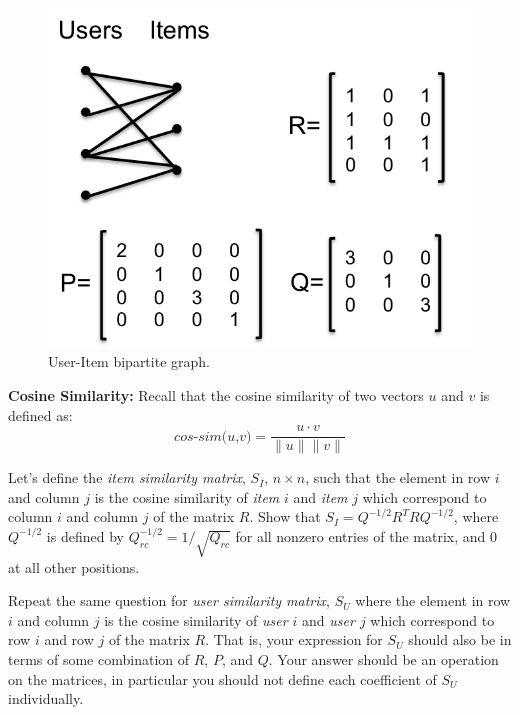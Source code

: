\begin{figure}[htbp]
\begin{center}
\includegraphics{user_item.png}
\caption{User-Item bipartite graph.}
\label{figpath}
\end{center}
\end{figure}

\vspace{0.4in}
\textbf{Cosine Similarity:} Recall that the cosine similarity of two vectors $u$
and $v$ is defined as:
\[ \textit{cos-sim(u,v)} = \frac {u \cdot v}{\|u\|\|v\|} \]


Let's define the \textit{item similarity matrix}, $S_{I}$, $n \times n$, such
that the element in row $i$ and column $j$ is the cosine similarity of \textit{item}
$i$ and \textit{item} $j$ which correspond to column $i$ and column $j$ of the matrix $R$. 
Show that $S_I = Q^{-1/2}R^TRQ^{-1/2}$, where $Q^{-1/2}$ is defined by $Q^{-1/2}_{rc} = 1/\sqrt{Q_{rc}}$ for all nonzero entries of the matrix, and $0$ at all other positions.

Repeat the same question for \textit{user similarity matrix}, $S_{U}$ where the
element in row $i$ and column $j$ is the cosine similarity of {\em user $i$} and
{\em user $j$}  which correspond to row $i$ and row $j$ of the matrix $R$. That is,
your expression for $S_U$ should also be in terms of some combination of $R$,
$P$, and $Q$. Your answer should be an operation on the matrices, in particular
you should not define each coefficient of $S_U$ individually.

